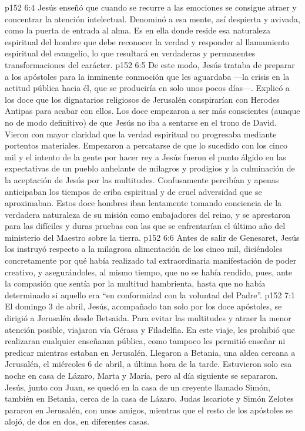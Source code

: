 \vs p152 6:4 \pc Jesús enseñó que cuando se recurre a las emociones se consigue atraer y concentrar la atención intelectual. Denominó a esa mente, así despierta y avivada, como la puerta de entrada al alma. Es en ella donde reside esa naturaleza espiritual del hombre que debe reconocer la verdad y responder al llamamiento espiritual del evangelio, lo que resultará en verdaderas y permanentes transformaciones del carácter.
\vs p152 6:5 De este modo, Jesús trataba de preparar a los apóstoles para la inminente conmoción que les aguardaba ---la crisis en la actitud pública hacia él, que se produciría en solo unos pocos días---. Explicó a los doce que los dignatarios religiosos de Jerusalén conspirarían con Herodes Antipas para acabar con ellos. Los doce empezaron a ser más conscientes (aunque no de modo definitivo) de que Jesús no iba a sentarse en el trono de David. Vieron con mayor claridad que la verdad espiritual no progresaba mediante portentos materiales. Empezaron a percatarse de que lo sucedido con los cinco mil y el intento de la gente por hacer rey a Jesús fueron el punto álgido en las expectativas de un pueblo anhelante de milagros y prodigios y la culminación de la aceptación de Jesús por las multitudes. Confusamente percibían y apenas anticipaban los tiempos de criba espiritual y de cruel adversidad que se aproximaban. Estos doce hombres iban lentamente tomando conciencia de la verdadera naturaleza de su misión como embajadores del reino, y se aprestaron para las difíciles y duras pruebas con las que se enfrentarían el último año del ministerio del Maestro sobre la tierra.
\vs p152 6:6 \pc Antes de salir de Genesaret, Jesús los instruyó respecto a la milagrosa alimentación de los cinco mil, diciéndoles concretamente por qué había realizado tal extraordinaria manifestación de poder creativo, y asegurándoles, al mismo tiempo, que no se había rendido, pues, ante la compasión que sentía por la multitud hambrienta, hasta que no había determinado si aquello era “en conformidad con la voluntad del Padre”.
\vs p152 7:1 El domingo 3 de abril, Jesús, acompañado tan solo por los doce apóstoles, se dirigió a Jerusalén desde Betsaida. Para evitar las multitudes y atraer la menor atención posible, viajaron vía Gérasa y Filadelfia. En este viaje, les prohibió que realizaran cualquier enseñanza pública, como tampoco les permitió enseñar ni predicar mientras estaban en Jerusalén. Llegaron a Betania, una aldea cercana a Jerusalén, el miércoles 6 de abril, a última hora de la tarde. Estuvieron solo esa noche en casa de Lázaro, Marta y María, pero al día siguiente se separaron. Jesús, junto con Juan, se quedó en la casa de un creyente llamado Simón, también en Betania, cerca de la casa de Lázaro. Judas Iscariote y Simón Zelotes pararon en Jerusalén, con unos amigos, mientras que el resto de los apóstoles se alojó, de dos en dos, en diferentes casas.
